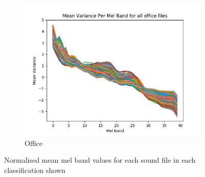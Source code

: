 \documentclass[11pt]{article}
\begin{document}
\begin{figure}[h]
\begin{subfigure}[t]{0.31\textwidth}
		\includegraphics[width=\textwidth]{figures/officeVar.png}
		\caption{Office}
	\end{subfigure}
	\caption{Normalised mean mel band values for each sound file in each classification shown}
	\label{fig:beachCarOfficeVar}
\end{figure}
\end{document}
